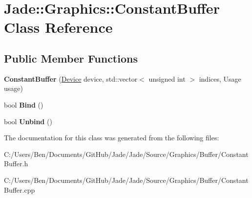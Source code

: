 \hypertarget{class_jade_1_1_graphics_1_1_constant_buffer}{}\section{Jade\+:\+:Graphics\+:\+:Constant\+Buffer Class Reference}
\label{class_jade_1_1_graphics_1_1_constant_buffer}
\subsection*{Public Member Functions}
\begin{DoxyCompactItemize}
\item 
\hypertarget{class_jade_1_1_graphics_1_1_constant_buffer_a411c8b44d703ce5a8f27305f9f2499da}{}{\bfseries Constant\+Buffer} (\hyperlink{class_jade_1_1_graphics_1_1_device}{Device} device, std\+::vector$<$ unsigned int $>$ indices, Usage usage)\label{class_jade_1_1_graphics_1_1_constant_buffer_a411c8b44d703ce5a8f27305f9f2499da}

\item 
\hypertarget{class_jade_1_1_graphics_1_1_constant_buffer_ad6543ed0c404a1a28ca498c20597e0dd}{}bool {\bfseries Bind} ()\label{class_jade_1_1_graphics_1_1_constant_buffer_ad6543ed0c404a1a28ca498c20597e0dd}

\item 
\hypertarget{class_jade_1_1_graphics_1_1_constant_buffer_aac9a4053f8e38a4157f7a1e98d37a292}{}bool {\bfseries Unbind} ()\label{class_jade_1_1_graphics_1_1_constant_buffer_aac9a4053f8e38a4157f7a1e98d37a292}

\end{DoxyCompactItemize}


The documentation for this class was generated from the following files\+:\begin{DoxyCompactItemize}
\item 
C\+:/\+Users/\+Ben/\+Documents/\+Git\+Hub/\+Jade/\+Jade/\+Source/\+Graphics/\+Buffer/Constant\+Buffer.\+h\item 
C\+:/\+Users/\+Ben/\+Documents/\+Git\+Hub/\+Jade/\+Jade/\+Source/\+Graphics/\+Buffer/Constant\+Buffer.\+cpp\end{DoxyCompactItemize}
